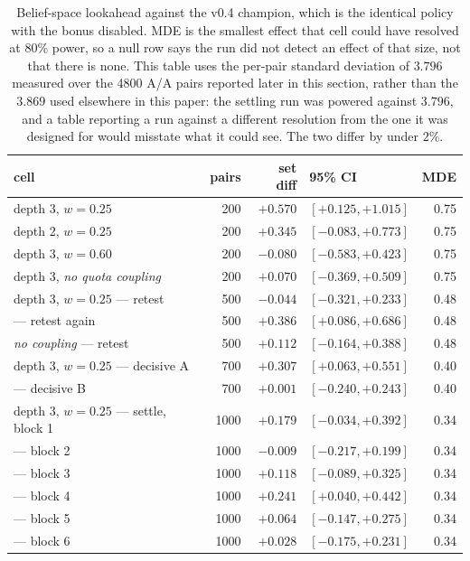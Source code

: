 \documentclass[11pt,letterpaper]{article}
\begin{document}
\begin{table}[t]
\centering
\small
\begin{tabular}{lrrlr}
\toprule
cell & pairs & set diff & 95\% CI & MDE \\
\midrule
depth 3, $w=0.25$ & 200 & $\mathbf{+0.570}$ & $[+0.125, +1.015]$ & 0.75 \\
depth 2, $w=0.25$ & 200 & $+0.345$ & $[-0.083, +0.773]$ & 0.75 \\
depth 3, $w=0.60$ & 200 & $-0.080$ & $[-0.583, +0.423]$ & 0.75 \\
depth 3, \emph{no quota coupling} & 200 & $+0.070$ & $[-0.369, +0.509]$ & 0.75 \\
\midrule
depth 3, $w=0.25$ --- retest & 500 & $-0.044$ & $[-0.321, +0.233]$ & 0.48 \\
\midrule
\quad --- retest again & 500 & $\mathbf{+0.386}$ & $[+0.086, +0.686]$ & 0.48 \\
\midrule
\emph{no coupling} --- retest & 500 & $+0.112$ & $[-0.164, +0.388]$ & 0.48 \\
\midrule
depth 3, $w=0.25$ --- decisive A & 700 & $\mathbf{+0.307}$ & $[+0.063, +0.551]$ & 0.40 \\
\midrule
\quad --- decisive B & 700 & $+0.001$ & $[-0.240, +0.243]$ & 0.40 \\
depth 3, $w=0.25$ --- settle, block 1 & 1000 & $+0.179$ & $[-0.034, +0.392]$ & 0.34 \\
\quad --- block 2 & 1000 & $-0.009$ & $[-0.217, +0.199]$ & 0.34 \\
\quad --- block 3 & 1000 & $+0.118$ & $[-0.089, +0.325]$ & 0.34 \\
\quad --- block 4 & 1000 & $\mathbf{+0.241}$ & $[+0.040, +0.442]$ & 0.34 \\
\quad --- block 5 & 1000 & $+0.064$ & $[-0.147, +0.275]$ & 0.34 \\
\quad --- block 6 & 1000 & $+0.028$ & $[-0.175, +0.231]$ & 0.34 \\
\bottomrule
\end{tabular}
\caption{Belief-space lookahead against the v0.4 champion, which is the identical policy with the bonus disabled. MDE is the smallest effect that cell could have resolved at 80\% power, so a null row says the run did not detect an effect of that size, not that there is none. This table uses the per-pair standard deviation of $3.796$ measured over the 4800 A/A pairs reported later in this section, rather than the $3.869$ used elsewhere in this paper: the settling run was powered against $3.796$, and a table reporting a run against a different resolution from the one it was designed for would misstate what it could see. The two differ by under $2\%$.}
\label{tab:lookahead}
\end{table}
\end{document}
